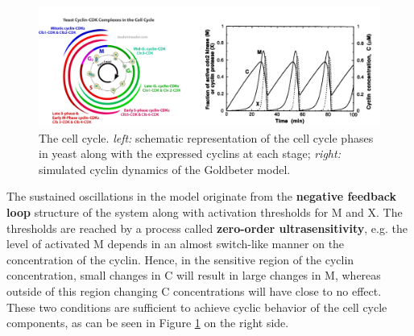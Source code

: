 \documentclass[a4paper,11pt,twoside]{article}
\begin{document}
\begin{figure}[h!]
 \centering
 \includegraphics[width=\linewidth]{./Pictures/CellCycle.pdf}
 \caption{The cell cycle. \textit{left:} schematic representation of the cell cycle phases in yeast along with the expressed cyclins at each stage; \textit{right:} simulated cyclin dynamics of the Goldbeter model.}
 \label{fig:CellCycleBio}
\end{figure}

\newpage
The sustained oscillations in the model originate from the {\bf negative feedback loop} structure of the system along with activation thresholds for M and X. The thresholds are reached by a process called {\bf zero-order ultrasensitivity}, e.g. the level of activated M depends in an almost switch-like manner on the concentration of the cyclin. Hence, in the sensitive region of the cyclin concentration, small changes in C will result in large changes in M, whereas outside of this region changing C concentrations will have close to no effect.\\
These two conditions are sufficient to achieve cyclic behavior of the cell cycle components, as can be seen in Figure \ref{fig:CellCycleBio} on the right side.


 
\end{document}
